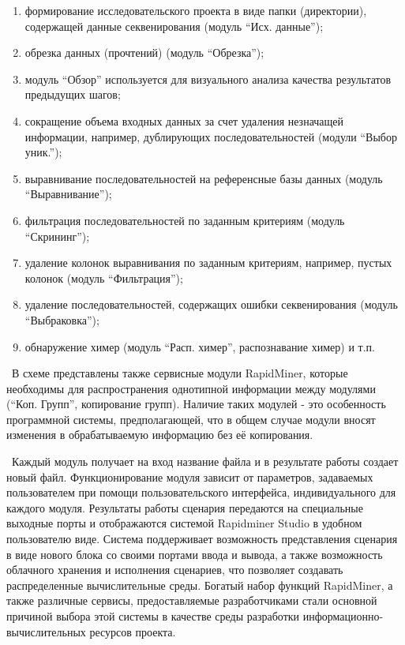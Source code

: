 \documentclass[a4paper,12pt,openany,final]{extreport}
\begin{document}
\begin{enumerate}
\def\labelenumi{\arabic{enumi}.}
\item
  формирование исследовательского проекта в виде папки (директории),
  содержащей данные секвенирования (модуль ``Исх. данные'');
\item
  обрезка данных (прочтений) (модуль ``Обрезка'');
\item
  модуль ``Обзор'' используется для визуального анализа качества
  результатов предыдущих шагов;
\item
  сокращение объема входных данных за счет удаления незначащей
  информации, например, дублирующих последовательностей (модули ``Выбор
  уник.'');
\item
  выравнивание последовательностей на референсные базы данных (модуль
  ``Выравнивание'');
\item
  фильтрация последовательностей по заданным критериям (модуль
  ``Скрининг'');
\item
  удаление колонок выравнивания по заданным критериям, например, пустых
  колонок (модуль ``Фильтрация'');
\item
  удаление последовательностей, содержащих ошибки секвенирования (модуль
  ``Выбраковка'');
\item
  обнаружение химер (модуль ``Расп. химер'', распознавание химер) и т.п.
\end{enumerate}

~В схеме представлены также сервисные модули RapidMiner, которые
необходимы для распространения однотипной информации между модулями
(``Коп. Групп'', копирование групп). Наличие таких модулей - это
особенность программной системы, предполагающей, что в общем случае
модули вносят изменения в обрабатываемую информацию без её копирования.

~Каждый модуль получает на вход название файла и в результате работы
создает новый файл. Функционирование модуля зависит от параметров,
задаваемых пользователем при помощи пользовательского интерфейса,
индивидуального для каждого модуля. Результаты работы сценария
передаются на специальные выходные порты и отображаются системой
Rapidminer Studio в удобном пользователю виде. Система поддерживает
возможность представления сценария в виде нового блока со своими портами
ввода и вывода, а также возможность облачного хранения и исполнения
сценариев, что позволяет создавать распределенные вычислительные среды.
Богатый набор функций RapidMiner, а также различные сервисы,
предоставляемые разработчиками стали основной причиной выбора этой
системы в качестве среды разработки информационно-вычислительных
ресурсов проекта.
\end{document}
